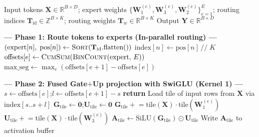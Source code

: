 \documentclass[runningheads]{llncs}
\begin{document}
\begin{algorithm}[h]
\caption{Fused MoE FFN -- Optimized Triton Kernel}
\begin{scriptsize} 
\label{alg:fused}
\begin{algorithmic}[1]
\Require Input tokens $\mathbf{X}\in\mathbb{R}^{B\times D}$; expert weights
         $\{\mathbf{W}_1^{(e)},\mathbf{W}_3^{(e)},\mathbf{W}_2^{(e)}\}_{e=1}^{E}$;
         routing indices $\mathbf{T}_{\text{id}}\in\mathbb{Z}^{B\times K}$;
         routing weights $\mathbf{T}_w\in\mathbb{R}^{B\times K}$
\Ensure  Output $\mathbf{Y}\in\mathbb{R}^{B\times D}$

\Statex \textbf{--- Phase 1: Route tokens to experts (In-parallel routing) ---}
\State $(\text{expert}[n],\;\text{pos}[n]) \gets \textsc{Sort}(\mathbf{T}_{\text{id}}.\text{flatten}())$
\State $\text{index}[n] \gets \text{pos}[n] \,/\!/ \;K$
\State $\text{offsets}[e] \gets \textsc{CumSum}(\textsc{BinCount}(\text{expert},\, E))$
\State $\text{max\_seg} \gets \max_{e}(\text{offsets}[e\!+\!1] - \text{offsets}[e])$

\Statex
\Statex \textbf{--- Phase 2: Fused Gate$+$Up projection with SwiGLU (Kernel 1) ---}
\Statex {}
    \State $s \gets \text{offsets}[e]$;\enspace $l \gets \text{offsets}[e\!+\!1] - s$
     \textbf{return} 
    \EndIf
    \State Load tile of input rows from $\mathbf{X}$ via $\text{index}[s .. s\!+\!l]$
    \State $\mathbf{G}_{\text{tile}} \gets \mathbf{0}$;\enspace $\mathbf{U}_{\text{tile}} \gets \mathbf{0}$
        \State $\mathbf{G}_{\text{tile}} \mathrel{+}= \text{tile}(\mathbf{X}) \cdot \text{tile}(\mathbf{W}_1^{(e)})$
        \State $\mathbf{U}_{\text{tile}} \mathrel{+}= \text{tile}(\mathbf{X}) \cdot \text{tile}(\mathbf{W}_3^{(e)})$
    \EndFor
    \State $\mathbf{A}_{\text{tile}} \gets \text{SiLU}(\mathbf{G}_{\text{tile}}) \odot \mathbf{U}_{\text{tile}}$
    \State Write $\mathbf{A}_{\text{tile}}$ to activation buffer
\EndFor


\end{algorithmic}
\end{scriptsize}
\end{algorithm}
\end{document}
